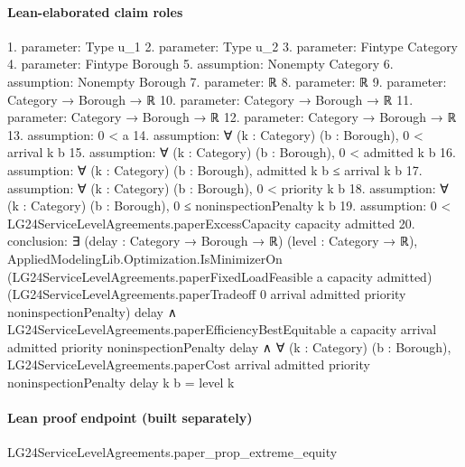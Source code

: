 \documentclass[10pt]{article}
\begin{document}
\paragraph{Lean-elaborated claim roles}\begin{ReviewVerbatim}
1. parameter: Type u_1
2. parameter: Type u_2
3. parameter: Fintype Category
4. parameter: Fintype Borough
5. assumption: Nonempty Category
6. assumption: Nonempty Borough
7. parameter: ℝ
8. parameter: ℝ
9. parameter: Category → Borough → ℝ
10. parameter: Category → Borough → ℝ
11. parameter: Category → Borough → ℝ
12. parameter: Category → Borough → ℝ
13. assumption: 0 < a
14. assumption: ∀ (k : Category) (b : Borough), 0 < arrival k b
15. assumption: ∀ (k : Category) (b : Borough), 0 < admitted k b
16. assumption: ∀ (k : Category) (b : Borough), admitted k b ≤ arrival k b
17. assumption: ∀ (k : Category) (b : Borough), 0 < priority k b
18. assumption: ∀ (k : Category) (b : Borough), 0 ≤ noninspectionPenalty k b
19. assumption: 0 < LG24ServiceLevelAgreements.paperExcessCapacity capacity admitted
20. conclusion: ∃ (delay : Category → Borough → ℝ) (level : Category → ℝ),
  AppliedModelingLib.Optimization.IsMinimizerOn (LG24ServiceLevelAgreements.paperFixedLoadFeasible a capacity admitted)
      (LG24ServiceLevelAgreements.paperTradeoff 0 arrival admitted priority noninspectionPenalty) delay ∧
    LG24ServiceLevelAgreements.paperEfficiencyBestEquitable a capacity arrival admitted priority noninspectionPenalty
        delay ∧
      ∀ (k : Category) (b : Borough),
        LG24ServiceLevelAgreements.paperCost arrival admitted priority noninspectionPenalty delay k b = level k
\end{ReviewVerbatim}

\paragraph{Lean proof endpoint (built separately)}\begin{ReviewVerbatim}
LG24ServiceLevelAgreements.paper_prop_extreme_equity
\end{ReviewVerbatim}
\end{document}
